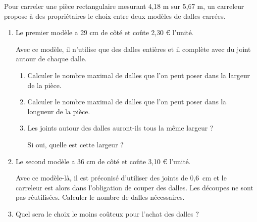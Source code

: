 \documentclass{cornouaille}
\begin{document}




\begin{exercice}

Pour carreler une pièce rectangulaire mesurant 4,18 m sur 5,67 m, un carreleur propose à des propriétaires le choix entre deux modèles de dalles carrées.
\begin{enumerate}
\item Le premier modèle a 29 cm de côté et coûte 2,30 \euro{} l'unité.

Avec ce modèle, il n'utilise que des dalles entières et il complète avec du joint autour de chaque dalle.
\begin{enumerate}
\item Calculer le nombre maximal de dalles que l'on peut poser dans la largeur de la pièce.
\item Calculer le nombre maximal de dalles que l'on peut poser dans la longueur de la pièce.
\item Les joints autour des dalles auront-ils tous la même largeur ?

Si oui, quelle est cette largeur ?
\end{enumerate}
\item Le second modèle a 36 cm de côté et coûte 3,10 \euro{} l'unité.

  Avec ce modèle-là, il est préconisé d'utiliser des joints de 0,6~cm
  et le carreleur est alors dans l'obligation de couper des
  dalles. Les découpes ne sont pas réutilisées.  Calculer le nombre de
  dalles nécessaires.

\item Quel sera le choix le moins coûteux pour l'achat des dalles ?
\end{enumerate}
\end{exercice}

\end{document}
